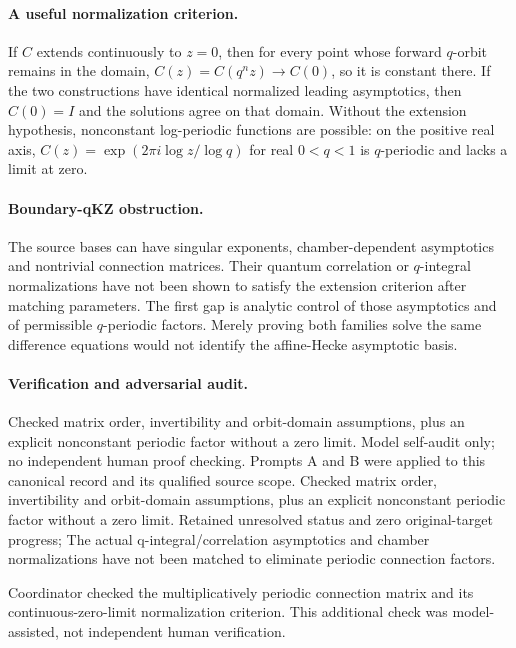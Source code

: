 \documentclass[11pt]{article}
\begin{document}
\paragraph{A useful normalization criterion.} If $C$ extends continuously to $z=0$, then for every point whose forward $q$-orbit remains in the domain, $C(z)=C(q^nz)\to C(0)$, so it is constant there. If the two constructions have identical normalized leading asymptotics, then $C(0)=I$ and the solutions agree on that domain. Without the extension hypothesis, nonconstant log-periodic functions are possible: on the positive real axis, $C(z)=\exp(2\pi i\log z/\log q)$ for real $0<q<1$ is $q$-periodic and lacks a limit at zero.

\paragraph{Boundary-qKZ obstruction.} The source bases can have singular exponents, chamber-dependent asymptotics and nontrivial connection matrices. Their quantum correlation or $q$-integral normalizations have not been shown to satisfy the extension criterion after matching parameters. The first gap is analytic control of those asymptotics and of permissible $q$-periodic factors. Merely proving both families solve the same difference equations would not identify the affine-Hecke asymptotic basis.

\paragraph{Verification and adversarial audit.}
Checked matrix order, invertibility and orbit-domain assumptions, plus an explicit nonconstant periodic factor without a zero limit. Model self-audit only; no independent human proof checking. Prompts A and B were applied to this canonical record and its qualified source scope. Checked matrix order, invertibility and orbit-domain assumptions, plus an explicit nonconstant periodic factor without a zero limit. Retained unresolved status and zero original-target progress; The actual q-integral/correlation asymptotics and chamber normalizations have not been matched to eliminate periodic connection factors.

Coordinator checked the multiplicatively periodic connection matrix and its continuous-zero-limit normalization criterion. This additional check was model-assisted, not independent human verification.
\end{document}
